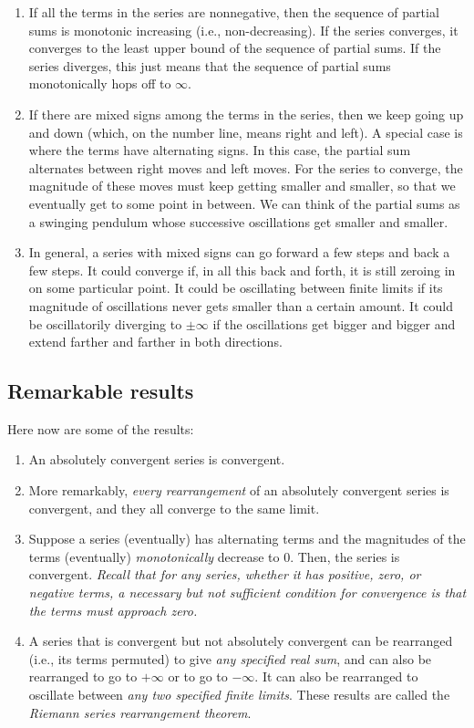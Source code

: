 \documentclass[10pt]{amsart}
\begin{document}
\begin{enumerate}
\item If all the terms in the series are nonnegative, then the
  sequence of partial sums is monotonic increasing (i.e.,
  non-decreasing). If the series converges, it converges to the least
  upper bound of the sequence of partial sums. If the series diverges,
  this just means that the sequence of partial sums monotonically hops
  off to $\infty$.
\item If there are mixed signs among the terms in the series, then we
  keep going up and down (which, on the number line, means right and
  left). A special case is where the terms have alternating signs. In
  this case, the partial sum alternates between right moves and left
  moves. For the series to converge, the magnitude of these moves must
  keep getting smaller and smaller, so that we eventually get to some
  point in between. We can think of the partial sums as a swinging
  pendulum whose successive oscillations get smaller and smaller.
\item In general, a series with mixed signs can go forward a few steps
  and back a few steps. It could converge if, in all this back and
  forth, it is still zeroing in on some particular point. It could be
  oscillating between finite limits if its magnitude of oscillations
  never gets smaller than a certain amount. It could be oscillatorily
  diverging to $\pm \infty$ if the oscillations get bigger and bigger
  and extend farther and farther in both directions.
\end{enumerate}

\subsection{Remarkable results}

Here now are some of the results:

\begin{enumerate}
\item An absolutely convergent series is convergent.
\item More remarkably, {\em every rearrangement} of an absolutely
  convergent series is convergent, and they all converge to the same
  limit.
\item Suppose a series (eventually) has alternating terms and the
  magnitudes of the terms (eventually) {\em monotonically} decrease to
  $0$. Then, the series is convergent. {\em Recall that for any
  series, whether it has positive, zero, or negative terms, a
  necessary but not sufficient condition for convergence is that the
  terms must approach zero.}
\item A series that is convergent but not absolutely convergent can be
  rearranged (i.e., its terms permuted) to give {\em any specified
  real sum}, and can also be rearranged to go to $+\infty$ or to go to
  $-\infty$. It can also be rearranged to oscillate between {\em any
  two specified finite limits}. These results are called the {\em
  Riemann series rearrangement theorem}.
\end{enumerate}
\end{document}
